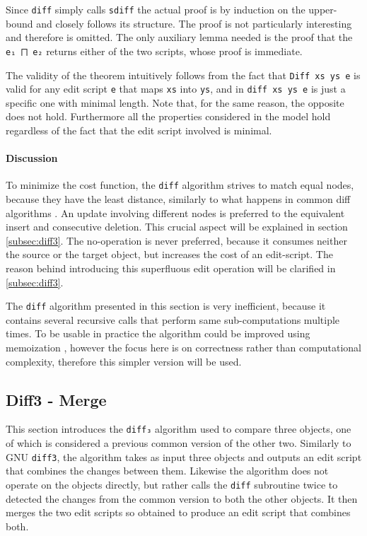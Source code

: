 \documentclass[../Thesis.tex]{subfiles}
\begin{document}
	Since \texttt{diff} simply calls \texttt{sdiff} 	 the actual proof is 
	by induction on the upper-bound and closely follows its
	structure. The proof is not particularly interesting and therefore is omitted.
	The only auxiliary lemma needed is the proof that the \texttt{e₁ ⨅ e₂} 
	returns	either of the two scripts, whose proof is immediate.	

	The validity of the theorem intuitively follows from the fact that 
	\texttt{Diff xs ys e} is valid for any edit script \texttt{e} that maps 
	\texttt{xs} into \texttt{ys}, and in \texttt{diff xs ys e} is just a
	specific one with minimal length.
	Note that, for the same reason, the opposite does not hold.
	Furthermore all the properties considered in the model hold regardless of 
	the fact that the edit script involved is minimal.
	
	\paragraph{Discussion}
	To minimize the cost function, the \texttt{diff} algorithm strives to 
	match equal nodes, because they have the least distance, similarly to 
	what happens in common diff algorithms \cite{Lemp09}.
	An update involving different nodes is preferred to the equivalent 
	insert and consecutive deletion. This crucial aspect will be explained
	in section \ref{subsec:diff3}.
	The no-operation is never preferred, because it consumes neither the
	source or the target object, but increases the cost of an edit-script.
	The reason behind introducing this superfluous edit operation	will be 
	clarified in \ref{subsec:diff3}.

	The \texttt{diff} algorithm presented in this section is very inefficient,
	because it contains several recursive calls that perform same 
	sub-computations multiple times. 
	To be usable in practice the algorithm could be improved using 
	memoization \cite{Lemp09}, however the focus here is on correctness 
	rather than computational complexity, therefore this simpler version will
	be used.

	\subsection{Diff3 - Merge} 
	\label{subsec:diff3}

	This section introduces the \texttt{diff₃} algorithm used to compare 
	three objects, one of which is considered a previous common version
	of the other two.
	Similarly to GNU \texttt{diff3}, the algorithm takes as input three objects
	and outputs an edit script that combines the changes between them.
	Likewise the algorithm does not operate on the objects directly,
	but rather calls the \texttt{diff} subroutine twice to detected the changes 
	from the common version to both the other objects.
	It then merges the two edit scripts so obtained to produce an edit script
	that combines both.
	
\end{document}
